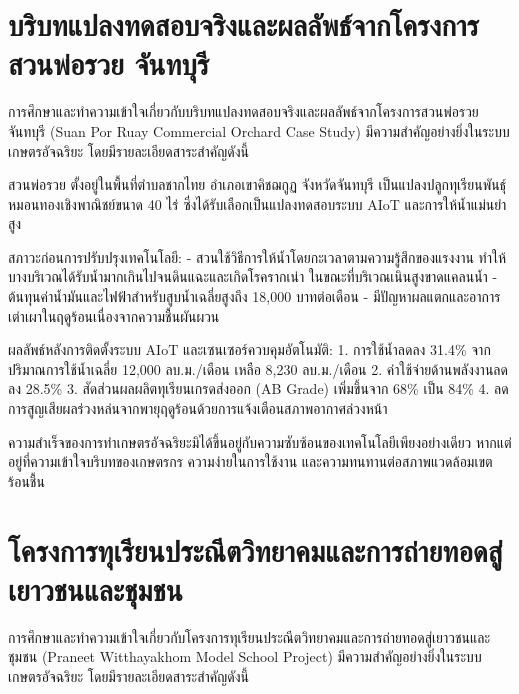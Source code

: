 
\section{บริบทแปลงทดสอบจริงและผลลัพธ์จากโครงการสวนพ่อรวย จันทบุรี}

การศึกษาและทำความเข้าใจเกี่ยวกับบริบทแปลงทดสอบจริงและผลลัพธ์จากโครงการสวนพ่อรวย จันทบุรี (Suan Por Ruay Commercial Orchard Case Study) มีความสำคัญอย่างยิ่งในระบบเกษตรอัจฉริยะ โดยมีรายละเอียดสาระสำคัญดังนี้

สวนพ่อรวย ตั้งอยู่ในพื้นที่ตำบลชากไทย อำเภอเขาคิชฌกูฏ จังหวัดจันทบุรี เป็นแปลงปลูกทุเรียนพันธุ์หมอนทองเชิงพาณิชย์ขนาด 40 ไร่ ซึ่งได้รับเลือกเป็นแปลงทดสอบระบบ AIoT และการให้น้ำแม่นยำสูง

สภาวะก่อนการปรับปรุงเทคโนโลยี:
- สวนใช้วิธีการให้น้ำโดยกะเวลาตามความรู้สึกของแรงงาน ทำให้บางบริเวณได้รับน้ำมากเกินไปจนดินแฉะและเกิดโรครากเน่า ในขณะที่บริเวณเนินสูงขาดแคลนน้ำ
- ต้นทุนค่าน้ำมันและไฟฟ้าสำหรับสูบน้ำเฉลี่ยสูงถึง 18,000 บาทต่อเดือน
- มีปัญหาผลแตกและอาการเต่าเผาในฤดูร้อนเนื่องจากความชื้นผันผวน

ผลลัพธ์หลังการติดตั้งระบบ AIoT และเซนเซอร์ควบคุมอัตโนมัติ:
1. การใช้น้ำลดลง 31.4\% จากปริมาณการใช้น้ำเฉลี่ย 12,000 ลบ.ม./เดือน เหลือ 8,230 ลบ.ม./เดือน
2. ค่าใช้จ่ายด้านพลังงานลดลง 28.5\%
3. สัดส่วนผลผลิตทุเรียนเกรดส่งออก (AB Grade) เพิ่มขึ้นจาก 68\% เป็น 84\%
4. ลดการสูญเสียผลร่วงหล่นจากพายุฤดูร้อนด้วยการแจ้งเตือนสภาพอากาศล่วงหน้า

\begin{casebox}
ความสำเร็จของการทำเกษตรอัจฉริยะมิได้ขึ้นอยู่กับความซับซ้อนของเทคโนโลยีเพียงอย่างเดียว หากแต่อยู่ที่ความเข้าใจบริบทของเกษตรกร ความง่ายในการใช้งาน และความทนทานต่อสภาพแวดล้อมเขตร้อนชื้น
\end{casebox}

\section{โครงการทุเรียนประณีตวิทยาคมและการถ่ายทอดสู่เยาวชนและชุมชน}

การศึกษาและทำความเข้าใจเกี่ยวกับโครงการทุเรียนประณีตวิทยาคมและการถ่ายทอดสู่เยาวชนและชุมชน (Praneet Witthayakhom Model School Project) มีความสำคัญอย่างยิ่งในระบบเกษตรอัจฉริยะ โดยมีรายละเอียดสาระสำคัญดังนี้

